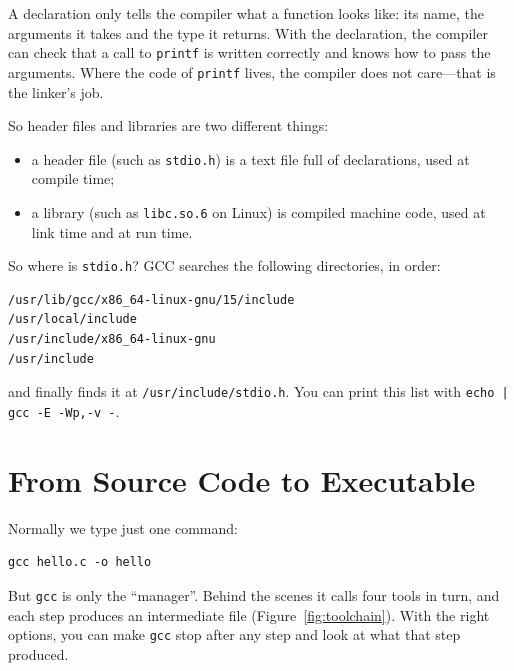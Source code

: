 A declaration only tells the compiler what a function looks like: its name, the arguments it takes and the type it returns. With the declaration, the compiler can check that a call to \texttt{printf} is written correctly and knows how to pass the arguments. Where the code of \texttt{printf} lives, the compiler does not care---that is the linker's job.

So header files and libraries are two different things:
\begin{itemize}
  \item a header file (such as \texttt{stdio.h}) is a text file full of declarations, used at compile time;
  \item a library (such as \texttt{libc.so.6} on Linux) is compiled machine code, used at link time and at run time.
\end{itemize}

So where is \texttt{stdio.h}? GCC searches the following directories, in order:
\begin{verbatim}
/usr/lib/gcc/x86_64-linux-gnu/15/include
/usr/local/include
/usr/include/x86_64-linux-gnu
/usr/include
\end{verbatim}
and finally finds it at \texttt{/usr/include/stdio.h}. You can print this list with \texttt{echo | gcc -E -Wp,-v -}.

\section{From Source Code to Executable}
\label{sec:toolchain}

Normally we type just one command:
\begin{verbatim}
gcc hello.c -o hello
\end{verbatim}
But \texttt{gcc} is only the ``manager''. Behind the scenes it calls four tools in turn, and each step produces an intermediate file (Figure~\ref{fig:toolchain}). With the right options, you can make \texttt{gcc} stop after any step and look at what that step produced.

